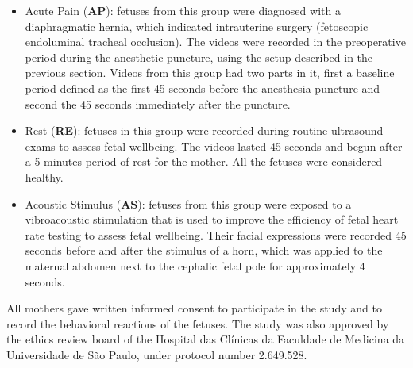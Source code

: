 \begin{itemize}
    \item Acute Pain (\textbf{AP}): fetuses from this group were diagnosed with a diaphragmatic hernia, which indicated intrauterine surgery (fetoscopic endoluminal tracheal occlusion). The videos were recorded in the preoperative period during the anesthetic puncture, using the setup described in the previous section. Videos from this group had two parts in it, first a baseline period defined as the first 45 seconds before the anesthesia puncture and second the 45 seconds immediately after the puncture. 
    
    \item Rest (\textbf{RE}): fetuses in this group were recorded during routine ultrasound exams to assess fetal wellbeing. The videos lasted 45 seconds and begun after a 5 minutes period of rest for the mother. All the fetuses were considered healthy.
    
    \item Acoustic Stimulus (\textbf{AS}): fetuses from this group were exposed to a vibroacoustic stimulation that is used to improve the efficiency of fetal heart rate testing to assess fetal wellbeing. Their facial expressions were recorded 45 seconds before and after the stimulus of a horn, which was applied to the maternal abdomen next to the cephalic fetal pole for approximately 4 seconds.
\end{itemize}

All mothers gave written informed consent to participate in the study and to record the behavioral reactions of the fetuses. The study was also approved by the ethics review board of the Hospital das Clínicas da Faculdade de Medicina da Universidade de São Paulo, under protocol number 2.649.528.
